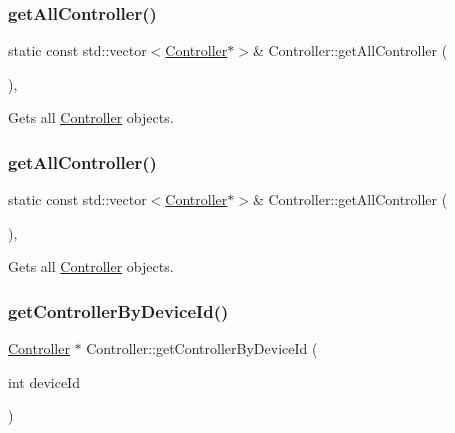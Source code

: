 \subsubsection{\texorpdfstring{get\+All\+Controller()}{getAllController()}\hspace{0.1cm}{\footnotesize\ttfamily [1/2]}}
{\footnotesize\ttfamily static const std\+::vector$<$\hyperlink{classController}{Controller}$\ast$$>$\& Controller\+::get\+All\+Controller (\begin{DoxyParamCaption}{ }\end{DoxyParamCaption})\hspace{0.3cm}{\ttfamily [inline]}, {\ttfamily [static]}}

Gets all \hyperlink{classController}{Controller} objects. \mbox{\label{classController_a5fc9812dfd76de7a0457589035472575}} 
\subsubsection{\texorpdfstring{get\+All\+Controller()}{getAllController()}\hspace{0.1cm}{\footnotesize\ttfamily [2/2]}}
{\footnotesize\ttfamily static const std\+::vector$<$\hyperlink{classController}{Controller}$\ast$$>$\& Controller\+::get\+All\+Controller (\begin{DoxyParamCaption}{ }\end{DoxyParamCaption})\hspace{0.3cm}{\ttfamily [inline]}, {\ttfamily [static]}}

Gets all \hyperlink{classController}{Controller} objects. \mbox{\label{classController_a51b65b0165848b09f427825f96a85fa0}} 
\subsubsection{\texorpdfstring{get\+Controller\+By\+Device\+Id()}{getControllerByDeviceId()}}
{\footnotesize\ttfamily \hyperlink{classController}{Controller} $\ast$ Controller\+::get\+Controller\+By\+Device\+Id (\begin{DoxyParamCaption}\item[{int}]{device\+Id }\end{DoxyParamCaption})\hspace{0.3cm}{\ttfamily [static]}}

